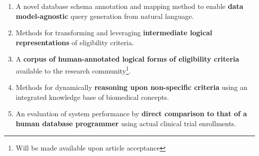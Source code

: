 \documentclass[../main.tex]{subfiles}
\begin{document}
\begin{enumerate}
    \item{A novel database schema annotation and mapping method to enable \textbf{data model-agnostic} query generation from natural language.}
    \item{Methods for transforming and leveraging \textbf{intermediate logical representations} of eligibility criteria.}
    \item{A \textbf{corpus of human-annotated logical forms of eligibility criteria} available to the research community\footnote{Will be made available upon article acceptance}.}
    \item{Methods for dynamically \textbf{reasoning upon non-specific criteria} using an integrated knowledge base of biomedical concepts.}
    \item{An evaluation of system performance by \textbf{direct comparison to that of a human database programmer} using actual clinical trial enrollments}.
\end{enumerate}
\end{document}
